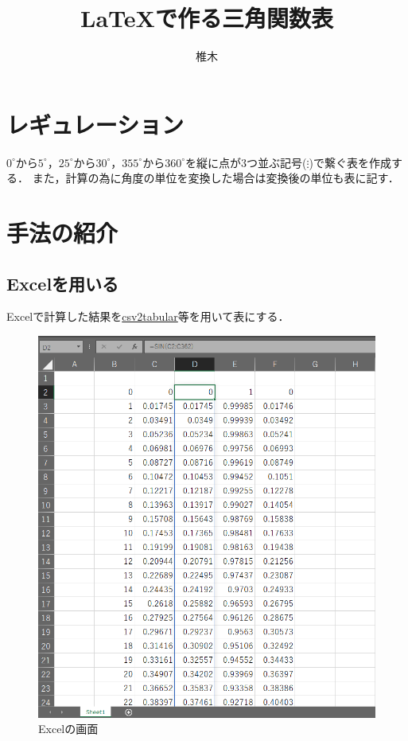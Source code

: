 \documentclass{ltjsarticle}
\title{\LaTeX で作る三角関数表}
\author{椎木}
\begin{document}
\maketitle
\section{レギュレーション}
$0^\circ$から$5^\circ$，$25^\circ$から$30^\circ$，$355^\circ$から$360^\circ$を縦に点が3つ並ぶ記号($\vdots$)で繋ぐ表を作成する．
また，計算の為に角度の単位を変換した場合は変換後の単位も表に記す．
\section{手法の紹介}


\subsection{Excelを用いる}
Excelで計算した結果を\href{https://rra.yahansugi.com/scriptapplet/csv2tabular/}{csv2tabular}等を用いて表にする．
\begin{figure}
    \centering
    \includegraphics[scale=0.6]{ex.png}
    \caption{Excelの画面}
\end{figure}
\end{document}
